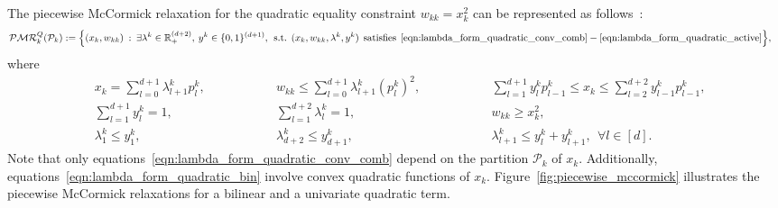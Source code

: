 \documentclass{article}
\newcommand{\pmc}{piecewise McCormick}
\newcommand{\R}{\mathbb{R}}
\begin{document}
The {\pmc} relaxation for the quadratic equality constraint $w_{kk} = x^2_k$ can be represented as follows~\cite{lu2018tight,nagarajan2019adaptive}:
\begin{align*}
\mathcal{PMR}^Q_{k}(\mathcal{P}_k) &:= \Big\{ (x_k, w_{kk}) \: : \: \exists \lambda^{k} \in \R^{(d+2)}_+, \: y^{k} \in \{0,1\}^{(d+1)}, \:\: \text{s.t.} \:\: (x_k, w_{kk}, \lambda^{k}, y^{k}) \:\: \text{satisfies} \:\: \eqref{eqn:lambda_form_quadratic_conv_comb}-\eqref{eqn:lambda_form_quadratic_active} \Big\},
\end{align*}
where
\begin{subequations}
\begin{alignat}{3}
&x_k = \sum_{l=0}^{d+1} \lambda^{k}_{l+1} p^k_l, \qquad\qquad  && w_{kk} \leq \sum_{l=0}^{d+1} \lambda^{k}_{l+1} (p^k_l)^2, \qquad\qquad && \sum_{l=1}^{d+1} y^k_l p^k_{l-1} \leq x_k \leq \sum_{l=2}^{d+2} y^k_{l-1} p^k_{l-1}, \label{eqn:lambda_form_quadratic_conv_comb}\\
&\sum_{l=1}^{d+1} y^{k}_l = 1,   &&\sum_{l=1}^{d+2} \lambda^{k}_l = 1, && w_{kk} \geq x^2_k, \label{eqn:lambda_form_quadratic_bin} \\
&\lambda^{k}_{1} \leq y^k_1,  && \lambda^{k}_{d+2} \leq y^k_{d+1},  &&\lambda^{k}_{l+1} \leq y^k_l + y^k_{l+1}, \:\: \forall l \in [d]. \label{eqn:lambda_form_quadratic_active}
\end{alignat}
\end{subequations}
Note that only equations~\eqref{eqn:lambda_form_quadratic_conv_comb} depend on the partition $\mathcal{P}_k$ of $x_k$. 
Additionally, equations~\eqref{eqn:lambda_form_quadratic_bin} involve convex quadratic functions of $x_k$. 
Figure~\ref{fig:piecewise_mccormick} illustrates the {\pmc} relaxations for a bilinear and a univariate quadratic term.
\end{document}
